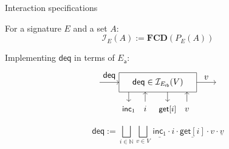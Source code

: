 \documentclass[aspectratio=141]{beamer}
\newcommand{\kw}[1]{\ensuremath{ \mathsf{#1} }}
\newcommand{\deqpic}[3]{%
  \begin{tikzpicture}[scale=0.4]
    \draw[->] (-6,0) -- node[above] {$\kw{deq}$} (-4,0);
    \draw (-4,-1) rectangle (4,1);
    \node (x) at (0,0) {$#1$};
    \draw[->] (-3, -1) -- (-3, -2);
    \node[anchor=base] at (-3, -3) {\small $\kw{inc}_1$};
    \draw[<-] (-1.3, -1) -- (-1.3, -2);
    \node[anchor=base] at (-1.3, -3) {$#2$};
    \draw[->] (1, -1) -- (1, -2);
    \node[anchor=base] at (1, -3) {\small $\kw{get}[#2]$};
    \draw[<-] (3, -1) -- (3, -2);
    \node[anchor=base] at (3, -3) {$#3$};
    \draw[->] (4,0) -- node[above] {$#3$} (6,0);
  \end{tikzpicture}%
}
\begin{document}
\begin{frame}{Interaction specifications} %
  \begin{definition}
    For a signature $E$ and a set $A$:
    \[
      \mathcal{I}_E(A) := \mathbf{FCD}(P_E(A))
    \]
  \end{definition}
  \pause
  \begin{example}
    Implementing $\kw{deq}$ in terms of $E_\kw{a}$:
    \[
      \deqpic{\kw{deq} \in \mathcal{I}_{E_\kw{rb}}(V)}{i}{v}
    \]
    \[
      \kw{deq} :=
        \bigsqcup_{i \in \mathbb{N}}
        \bigsqcup_{v \in V}
          \, \underline{\kw{inc}_1} \cdot i \cdot
             \underline{\kw{get}[i]} \cdot v \cdot \underline{v}
    \]
  \end{example}
\end{frame}
\end{document}
